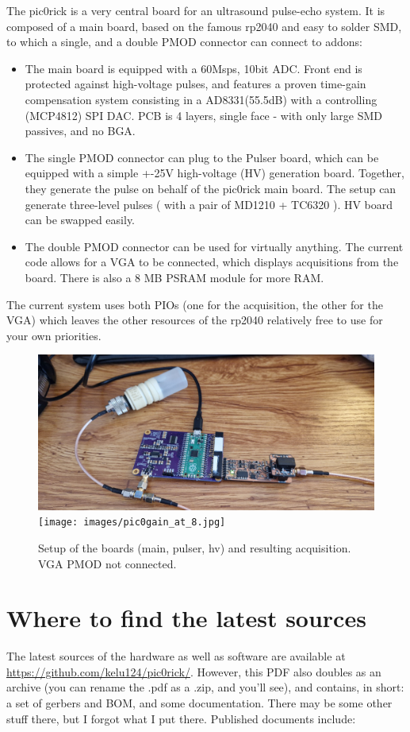 \documentclass{article}
\begin{document}
The pic0rick is a very central board for an ultrasound pulse-echo system. It is composed of a main board, based on the famous rp2040 and easy to solder SMD, to which a single, and a double PMOD connector can connect to addons:
\begin{itemize}
    \item The main board is equipped with a 60Msps, 10bit ADC. Front end is protected against high-voltage pulses, and features a proven time-gain compensation system consisting in a AD8331(55.5dB) with a controlling (MCP4812) SPI DAC. PCB is 4 layers, single face - with only large SMD passives, and no BGA.
    \item The single PMOD connector can plug to the Pulser board, which can be equipped with a simple +-25V high-voltage (HV) generation board. Together, they generate the pulse on behalf of the pic0rick main board. The setup can generate three-level pulses ( with a pair of MD1210 + TC6320 ). HV board can be swapped easily.
    \item The double PMOD connector can be used for virtually anything. The current code allows for a VGA to be connected, which displays acquisitions from the board. There is also a 8 MB PSRAM module for more RAM.
\end{itemize}
The current system uses both PIOs (one for the acquisition, the other for the VGA) which leaves the other resources of the rp2040 relatively free to use for your own priorities.

\begin{figure}[htp!]
  \centering
  \includegraphics[width=.45\textwidth]{images/20240406_153634_s.jpg}\hfill
  \texttt{[image: images/pic0gain\_at\_8.jpg]} 
  \caption{Setup of the boards (main, pulser, hv) and resulting acquisition. VGA PMOD not connected.} 
  \label{fig:desc}
\end{figure}

\section{Where to find the latest sources} 
 

The latest sources of the hardware as well as software are available at \url{https://github.com/kelu124/pic0rick/}. However, this PDF also doubles as an archive (you can rename the .pdf as a .zip, and you'll see), and contains, in short: a set of gerbers and BOM, and some documentation. There may be some other stuff there, but I forgot what I put there. Published documents include:
\end{document}
